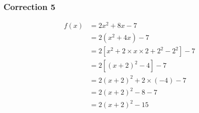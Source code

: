 \documentclass[15pt, mathserif]{beamer}
\begin{document}
\begin{frame}
\vspace{-10mm}
	\frametitle{Correction 5}
\begin{align*} f(x) &= 2x^2+8x-7\\ 
&=2\left(x^2+4x\right)-7\\ 
&=2\left[x^2+2\times x \times2+2^2-2^2\right]-7\\ 
&=2\left[ \left( x+2\right)^2-4\right]-7\\ 
&=2 \left( x+2\right)^2+2\times \left(-4\right)-7\\ 
&=2 \left( x+2\right)^2-8-7\\ 
&=2 \left( x+2\right)^2-15
 \end{align*} 

 \bigskip\end{frame}
\end{document}
